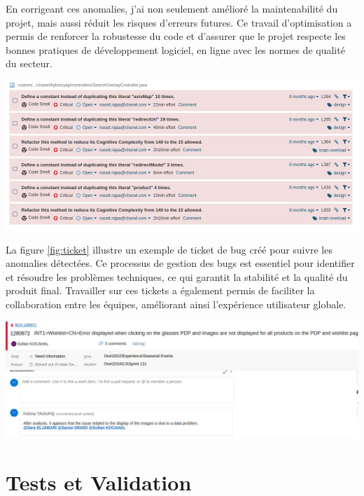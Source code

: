 En corrigeant ces anomalies, j'ai non seulement amélioré la maintenabilité du projet, mais aussi réduit les risques d'erreurs futures. Ce travail d'optimisation a permis de renforcer la  robustesse  du code et d'assurer que le projet respecte les bonnes pratiques de développement logiciel, en ligne avec les normes de qualité du secteur.
\begin{center}
    \centering
    \includegraphics[width=19cm]{Figures/Screens/bug.png}
    \label{fig:corr}
\end{center}
La figure \ref{fig:ticket} illustre un exemple de ticket de bug  créé pour suivre les anomalies détectées. Ce processus de gestion des bugs est essentiel pour identifier et résoudre les problèmes techniques, ce qui garantit la  stabilité  et la  qualité  du produit final. Travailler sur ces tickets a également permis de faciliter la collaboration entre les équipes, améliorant ainsi l'expérience utilisateur globale.
\begin{center}
    \centering
    \includegraphics[width=19cm]{Figures/Screens/ticket.png}
    \label{fig:ticket}
\end{center}
\section{Tests et Validation}
